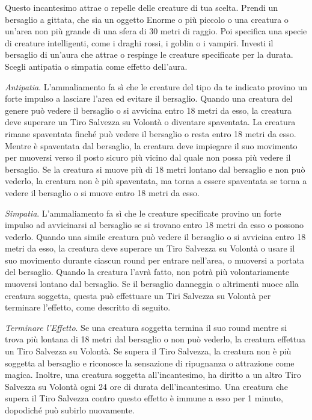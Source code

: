 \begin{multicols}{2}
Questo incantesimo attrae o repelle delle creature di tua scelta. Prendi un bersaglio a gittata, che sia un oggetto Enorme o più piccolo o una creatura o un'area non più grande di una sfera di 30 metri di raggio. Poi specifica una specie di creature intelligenti, come i draghi rossi, i goblin o i vampiri. Investi il bersaglio di un'aura che attrae o respinge le creature specificate per la durata. Scegli antipatia o simpatia come effetto dell'aura.

\emph{Antipatia}. L'ammaliamento fa sì che le creature del tipo da te indicato provino un forte impulso a lasciare l'area ed evitare il bersaglio. Quando una creatura del genere può vedere il bersaglio o si avvicina entro 18 metri da esso, la creatura deve superare un Tiro Salvezza su Volontà o diventare spaventata. La creatura rimane spaventata finché può vedere il bersaglio o resta entro 18 metri da esso. Mentre è spaventata dal bersaglio, la creatura deve impiegare il suo movimento per muoversi verso il posto sicuro più vicino dal quale non possa più vedere il bersaglio. Se la creatura si muove più di 18 metri lontano dal bersaglio e non può vederlo, la creatura non è più spaventata, ma torna a essere spaventata se torna a vedere il bersaglio o si muove entro 18 metri da esso.

\emph{Simpatia}. L'ammaliamento fa sì che le creature specificate provino un forte impulso ad avvicinarsi al bersaglio se si trovano entro 18 metri da esso o possono vederlo. Quando una simile creatura può vedere il bersaglio o si avvicina entro 18 metri da esso, la creatura deve superare un Tiro Salvezza su Volontà o usare il suo movimento durante ciascun round per entrare nell'area, o muoversi a portata del bersaglio. Quando la creatura l'avrà fatto, non potrà più volontariamente muoversi lontano dal bersaglio. Se il bersaglio danneggia o altrimenti nuoce alla creatura soggetta, questa può effettuare un Tiri Salvezza su Volontà per terminare l'effetto, come descritto di seguito.

\emph{Terminare l'Effetto}. Se una creatura soggetta termina il suo round mentre si trova più lontana di 18 metri dal bersaglio o non può vederlo, la creatura effettua un Tiro Salvezza su Volontà. Se supera il Tiro Salvezza, la creatura non è più soggetta al bersaglio e riconosce la sensazione di ripugnanza o attrazione come magica. Inoltre, una creatura soggetta all'incantesimo, ha diritto a un altro Tiro Salvezza su Volontà ogni 24 ore di durata dell'incantesimo. Una creatura che supera il Tiro Salvezza contro questo effetto è immune a esso per 1 minuto, dopodiché può subirlo nuovamente.


\end{multicols}

